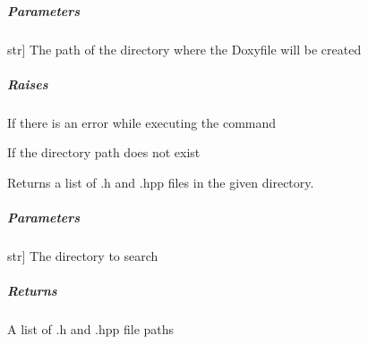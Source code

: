 \documentclass[letterpaper,10pt,english]{sphinxmanual}
\begin{document}
\begin{fulllineitems}
\begin{fulllineitems}
\subparagraph{Parameters}
\label{\detokenize{main.doxygen_management:id11}}\begin{description}
\sphinxlineitem{directory\_path}{[}str{]}
\sphinxAtStartPar
The path of the directory where the Doxyfile will be created

\end{description}


\subparagraph{Raises}
\label{\detokenize{main.doxygen_management:raises}}\begin{description}
\sphinxAtStartPar
If there is an error while executing the command

\sphinxAtStartPar
If the directory path does not exist

\end{description}

\end{fulllineitems}


\begin{fulllineitems}
\label{\detokenize{main.doxygen_management:main.doxygen_management.doxyfile_configurator.DoxyfileConfigurator.get_header_files}}
\pysigstartsignatures
{}
\pysigstopsignatures
\sphinxAtStartPar
Returns a list of .h and .hpp files in the given directory.


\subparagraph{Parameters}
\label{\detokenize{main.doxygen_management:id12}}\begin{description}
\sphinxlineitem{directory}{[}str{]}
\sphinxAtStartPar
The directory to search

\end{description}


\subparagraph{Returns}
\label{\detokenize{main.doxygen_management:id13}}\begin{description}
\sphinxAtStartPar
A list of .h and .hpp file paths

\end{description}

\end{fulllineitems}



\end{fulllineitems}
\end{document}
